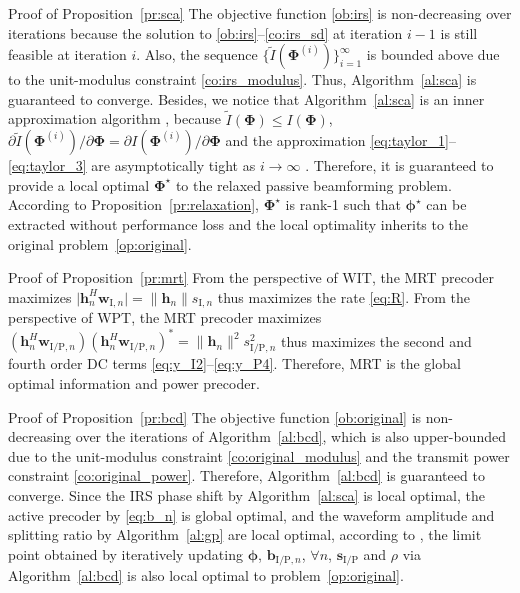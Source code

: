 \documentclass[journal]{IEEEtran}
\begin{document}
\begin{appendix}
		\begin{subsection}{Proof of Proposition~\ref{pr:sca}}\label{ap:sca}
			The objective function \eqref{ob:irs} is non-decreasing over iterations because the solution to \eqref{ob:irs}--\eqref{co:irs_sd} at iteration $i-1$ is still feasible at iteration $i$. Also, the sequence $\{\tilde{I}(\boldsymbol{\Phi}^{(i)})\}_{i=1}^{\infty}$ is bounded above due to the unit-modulus constraint \eqref{co:irs_modulus}. Thus, Algorithm~\ref{al:sca} is guaranteed to converge. Besides, we notice that Algorithm~\ref{al:sca} is an inner approximation algorithm \cite{Marks1978}, because $\tilde{I}(\boldsymbol{\Phi}) \le I(\boldsymbol{\Phi})$, $\partial\tilde{I}(\boldsymbol{\Phi}^{(i)})/\partial\boldsymbol{\Phi}=\partial I(\boldsymbol{\Phi}^{(i)})/\partial\boldsymbol{\Phi}$ and the approximation \eqref{eq:taylor_1}--\eqref{eq:taylor_3} are asymptotically tight as $i \to \infty$ \cite{Li2013}. Therefore, it is guaranteed to provide a local optimal $\boldsymbol{\Phi}^{\star}$ to the relaxed passive beamforming problem. According to Proposition~\ref{pr:relaxation}, $\boldsymbol{\Phi}^{\star}$ is rank-\num{1} such that $\boldsymbol{\phi}^{\star}$ can be extracted without performance loss and the local optimality inherits to the original problem~\eqref{op:original}.
		\end{subsection}

		\begin{subsection}{Proof of Proposition~\ref{pr:mrt}}\label{ap:mrt}
			From the perspective of WIT, the MRT precoder maximizes $\lvert{\boldsymbol{h}_{n}^H \boldsymbol{w}_{\mathrm{I}, n}}\rvert = \lVert{\boldsymbol{h}_{n}}\rVert s_{\mathrm{I}, n}$ thus maximizes the rate \eqref{eq:R}. From the perspective of WPT, the MRT precoder maximizes $(\boldsymbol{h}_{n}^H \boldsymbol{w}_{\mathrm{I/P}, n})(\boldsymbol{h}_{n}^H \boldsymbol{w}_{\mathrm{I/P}, n})^* = \lVert{\boldsymbol{h}_{n}}\rVert^2 s_{\mathrm{I/P}, n}^2$ thus maximizes the second and fourth order DC terms \eqref{eq:y_I2}--\eqref{eq:y_P4}. Therefore, MRT is the global optimal information and power precoder.
		\end{subsection}

		\begin{subsection}{Proof of Proposition~\ref{pr:bcd}}\label{ap:bcd}
			The objective function \eqref{ob:original} is non-decreasing over the iterations of Algorithm~\ref{al:bcd}, which is also upper-bounded due to the unit-modulus constraint \eqref{co:original_modulus} and the transmit power constraint \eqref{co:original_power}. Therefore, Algorithm~\ref{al:bcd} is guaranteed to converge. Since the IRS phase shift by Algorithm~\ref{al:sca} is local optimal, the active precoder by \eqref{eq:b_n} is global optimal, and the waveform amplitude and splitting ratio by Algorithm~\ref{al:gp} are local optimal, according to \cite{Grippo2000}, the limit point obtained by iteratively updating $\boldsymbol{\phi}$, $\boldsymbol{b}_{\mathrm{I/P},n}$, $\forall n$, $\boldsymbol{s}_{\mathrm{I/P}}$ and $\rho$ via Algorithm~\ref{al:bcd} is also local optimal to problem~\eqref{op:original}.
		\end{subsection}
	\end{appendix}

	
	
\end{document}
